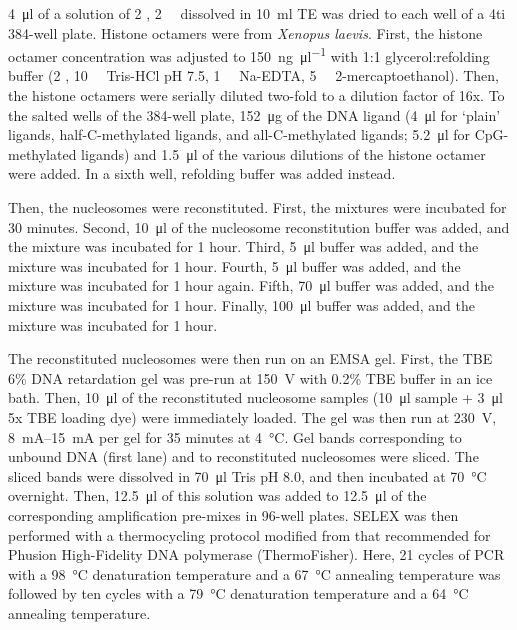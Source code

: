 \documentclass[parskip=full, numbers=noenddot]{scrreprt}
\begin{document}
\SI{4}{\micro\litre} of a solution of \SI{2}{\Molar} , \SI{2}{\milli\Molar}  dissolved in \SI{10}{\milli\litre} TE was dried to each well of a 4ti 384-well plate. Histone octamers were from \emph{Xenopus laevis}. First, the histone octamer concentration was adjusted to \SI{150}{\nano\gram\per\micro\litre} with 1:1 glycerol:refolding buffer (\SI{2}{\Molar} , \SI{10}{\milli\Molar} Tris-HCl pH 7.5, \SI{1}{\milli\Molar} Na-EDTA, \SI{5}{\milli\Molar} 2-mercaptoethanol). Then, the histone octamers were serially diluted two-fold to a dilution factor of 16x. To the salted wells of the 384-well plate, \SI{152}{\micro\gram} of the DNA ligand (\SI{4}{\micro\litre} for ‘plain’ ligands, half-C-methylated ligands, and all-C-methylated ligands; \SI{5.2}{\micro\litre} for CpG-methylated ligands) and \SI{1.5}{\micro\litre} of the various dilutions of the histone octamer were added. In a sixth well, refolding buffer was added instead.

Then, the nucleosomes were reconstituted. First, the mixtures were incubated for 30 minutes. Second, \SI{10}{\micro\litre} of the nucleosome reconstitution buffer was added, and the mixture was incubated for 1 hour. Third, \SI{5}{\micro\litre} buffer was added, and the mixture was incubated for 1 hour. Fourth, \SI{5}{\micro\litre} buffer was added, and the mixture was incubated for 1 hour again. Fifth, \SI{70}{\micro\litre} buffer was added, and the mixture was incubated for 1 hour. Finally, \SI{100}{\micro\litre} buffer was added, and the mixture was incubated for 1 hour.

The reconstituted nucleosomes were then run on an EMSA gel. First, the TBE 6\% DNA retardation gel was pre-run at \SI{150}{\volt} with 0.2\% TBE buffer in an ice bath. Then, \SI{10}{\micro\litre} of the reconstituted nucleosome samples (\SI{10}{\micro\litre} sample + \SI{3}{\micro\litre} 5x TBE loading dye) were immediately loaded. The gel was then run at \SI{230}{\volt}, \SIrange{8}{15}{\milli\ampere} per gel for 35 minutes at \SI{4}{\celsius}. Gel bands corresponding to unbound DNA (first lane) and to reconstituted nucleosomes were sliced. The sliced bands were dissolved in \SI{70}{\micro\litre} Tris pH 8.0, and then incubated at \SI{70}{\celsius} overnight. Then, \SI{12.5}{\micro\litre} of this solution was added to \SI{12.5}{\micro\litre} of the corresponding amplification pre-mixes in 96-well plates. SELEX was then performed with a thermocycling protocol modified from that recommended for Phusion High-Fidelity DNA polymerase (ThermoFisher). Here, 21 cycles of PCR with a \SI{98}{\celsius} denaturation temperature and a \SI{67}{\celsius} annealing temperature was followed by ten cycles with a \SI{79}{\celsius} denaturation temperature and a \SI{64}{\celsius} annealing temperature.
\end{document}
